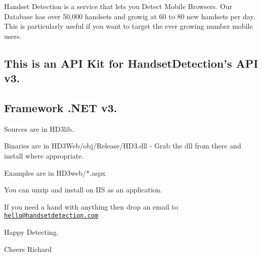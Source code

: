 Handset Detection is a service that lets you Detect Mobile Browsers. Our Database has over 50,000 handsets and growig at 60 to 80 new handsets per day. This is particularly useful if you want to target the ever growing number mobile users.

\subsection*{This is an A\+P\+I Kit for Handset\+Detection's A\+P\+I v3.}

\subsection*{Framework .N\+E\+T v3.}

Sources are in H\+D3lib.

Binaries are in H\+D3\+Web/obj/\+Release/\+H\+D3.\+dll -\/ Grab the dll from there and install where appropriate.

Examples are in H\+D3web/$\ast$.aspx

You can unzip and install on I\+I\+S as an application.

If you need a hand with anything then drop an email to \href{mailto:hello@handsetdetection.com}{\tt hello@handsetdetection.\+com}

Happy Detecting.

Cheers Richard 